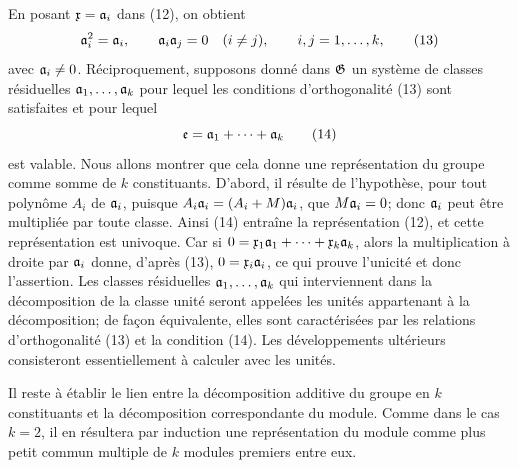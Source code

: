 En posant $\mathfrak{x}=\mathfrak{a}_i$ dans (12), on obtient
\begin{equation}
 \mathfrak{a}_i^2=\mathfrak{a}_i,
 \qquad \mathfrak{a}_i\mathfrak{a}_j=0\quad(i\ne j),
 \qquad i,j=1,\ldots,k,
\tag{13}
\end{equation}
avec $\mathfrak{a}_i\ne0$. Réciproquement, supposons donné dans $\mathfrak{G}$ un système de classes résiduelles $\mathfrak{a}_1,\ldots,\mathfrak{a}_k$ pour lequel les conditions d'orthogonalité (13) sont satisfaites et pour lequel
\begin{equation}
 \mathfrak{e}=\mathfrak{a}_1+\cdots+\mathfrak{a}_k
\tag{14}
\end{equation}
est valable. Nous allons montrer que cela donne une représentation du groupe comme somme de $k$ constituants. D'abord, il résulte de l'hypothèse, pour tout polynôme $A_i$ de $\mathfrak{a}_i$, puisque $A_i\mathfrak{a}_i=(A_i+M)\mathfrak{a}_i$, que $M\mathfrak{a}_i=0$; donc $\mathfrak{a}_i$ peut être multipliée par toute classe. Ainsi (14) entraîne la représentation (12), et cette représentation est univoque. Car si $0=\mathfrak{x}_1\mathfrak{a}_1+\cdots+\mathfrak{x}_k\mathfrak{a}_k$, alors la multiplication à droite par $\mathfrak{a}_i$ donne, d'après (13), $0=\mathfrak{x}_i\mathfrak{a}_i$, ce qui prouve l'unicité et donc l'assertion. Les classes résiduelles $\mathfrak{a}_1,\ldots,\mathfrak{a}_k$ qui interviennent dans la décomposition de la classe unité seront appelées les unités appartenant à la décomposition; de façon équivalente, elles sont caractérisées par les relations d'orthogonalité (13) et la condition (14). Les développements ultérieurs consisteront essentiellement à calculer avec les unités.

Il reste à établir le lien entre la décomposition additive du groupe en $k$ constituants et la décomposition correspondante du module. Comme dans le cas $k=2$, il en résultera par induction une représentation du module comme plus petit commun multiple de $k$ modules premiers entre eux.

